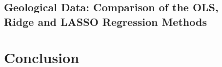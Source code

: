 \documentclass[]{article}
\begin{document}
\subsection{Geological Data: Comparison of the OLS, Ridge and LASSO Regression Methods}



\section{Conclusion}





\end{document}

